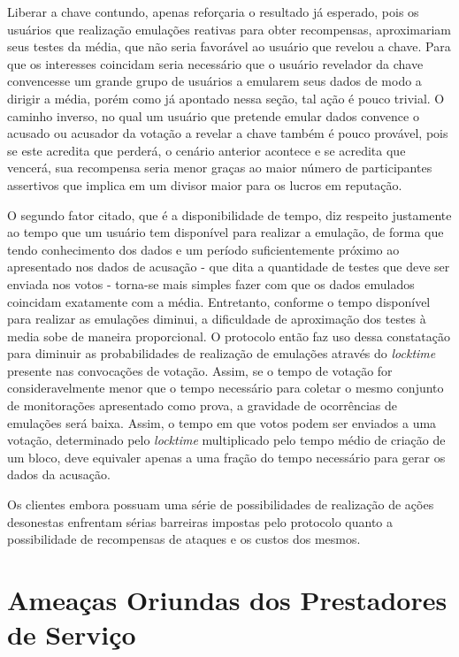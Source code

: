%
Liberar a chave contundo, apenas reforçaria o resultado já esperado, pois os usuários que realização emulações reativas para obter recompensas, aproximariam seus testes da média, que não seria favorável ao usuário que revelou a chave. Para que os interesses coincidam seria necessário que o usuário revelador da chave convencesse um grande grupo de usuários a emularem seus dados de modo a dirigir a média, porém como já apontado nessa seção, tal ação é pouco trivial. O caminho inverso, no qual um usuário que pretende emular dados convence o acusado ou acusador da votação a revelar a chave também é pouco provável, pois se este acredita que perderá, o cenário anterior acontece e se acredita que vencerá, sua recompensa seria menor graças ao maior número de participantes assertivos que implica em um divisor maior para os lucros em reputação.

O segundo fator citado, que é a disponibilidade de tempo, diz respeito justamente ao tempo que um usuário tem disponível para realizar a emulação, de forma que tendo conhecimento dos dados e um período suficientemente próximo ao apresentado nos dados de acusação - que dita a quantidade de testes que deve ser enviada nos votos - torna-se mais simples fazer com que os dados emulados coincidam exatamente com a média. Entretanto, conforme o tempo disponível para realizar as emulações diminui, a dificuldade de aproximação dos testes à media sobe de maneira proporcional. O protocolo então faz uso dessa constatação para diminuir as probabilidades de realização de emulações através do \textit{locktime} presente nas convocações de votação. Assim, se o tempo de votação for consideravelmente menor que o tempo necessário para coletar o mesmo conjunto de monitorações apresentado como prova, a gravidade de ocorrências de emulações será baixa. Assim, o tempo em que votos podem ser enviados a uma votação, determinado pelo \textit{locktime} multiplicado pelo tempo médio de criação de um bloco, deve equivaler apenas a uma fração do tempo necessário para gerar os dados da acusação.

Os clientes embora possuam uma série de possibilidades de realização de ações desonestas enfrentam sérias barreiras impostas pelo protocolo quanto a possibilidade de recompensas de ataques e os custos dos mesmos.

\section{Ameaças Oriundas dos Prestadores de Serviço}
\label{sec:ameacas_prestadores}

